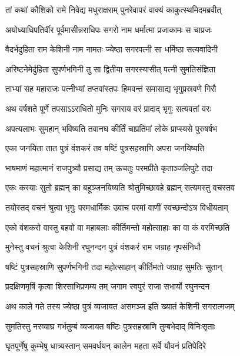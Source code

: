
\twolineshloka
{तां कथां कौशिको रामे निवेद्य मधुराक्षराम्}
{पुनरेवापरं वाक्यं काकुत्स्थमिदमब्रवीत्} %

\twolineshloka
{अयोध्याधिपतिर्वीर पूर्वमासीन्नराधिपः}
{सगरो नाम धर्मात्मा प्रजाकामः स चाप्रजः} %

\twolineshloka
{वैदर्भदुहिता राम केशिनी नाम नामतः}
{ज्येष्ठा सगरपत्नी सा धर्मिष्ठा सत्यवादिनी} %

\twolineshloka
{अरिष्टनेमेर्दुहिता सुपर्णभगिनी तु सा}
{द्वितीया सगरस्यासीत् पत्नी सुमतिसंज्ञिता} %

\twolineshloka
{ताभ्यां सह महाराजः पत्नीभ्यां तप्तवांस्तपः}
{हिमवन्तं समासाद्य भृगुप्रस्रवणे गिरौ} %

\twolineshloka
{अथ वर्षशते पूर्णे तपसाऽऽराधितो मुनिः}
{सगराय वरं प्रादाद् भृगुः सत्यवतां वरः} %

\twolineshloka
{अपत्यलाभः सुमहान् भविष्यति तवानघ}
{कीर्तिं चाप्रतिमां लोके प्राप्स्यसे पुरुषर्षभ} %

\twolineshloka
{एका जनयिता तात पुत्रं वंशकरं तव}
{षष्टिं पुत्रसहस्राणि अपरा जनयिष्यति} %

\twolineshloka
{भाषमाणं महात्मानं राजपुत्र्यौ प्रसाद्य तम्}
{ऊचतुः परमप्रीते कृताञ्जलिपुटे तदा} %

\twolineshloka
{एकः कस्याः सुतो ब्रह्मन् का बहूञ्जनयिष्यति}
{श्रोतुमिच्छावहे ब्रह्मन् सत्यमस्तु वचस्तव} %

\twolineshloka
{तयोस्तद् वचनं श्रुत्वा भृगुः परमधार्मिकः}
{उवाच परमां वाणीं स्वच्छन्दोऽत्र विधीयताम्} %

\twolineshloka
{एको वंशकरो वास्तु बहवो वा महाबलाः}
{कीर्तिमन्तो महोत्साहाः का वा कं वरमिच्छति} %

\twolineshloka
{मुनेस्तु वचनं श्रुत्वा केशिनी रघुनन्दन}
{पुत्रं वंशकरं राम जग्राह नृपसंनिधौ} %

\twolineshloka
{षष्टिं पुत्रसहस्राणि सुपर्णभगिनी तदा}
{महोत्साहान् कीर्तिमतो जग्राह सुमतिः सुतान्} %

\twolineshloka
{प्रदक्षिणमृषिं कृत्वा शिरसाभिप्रणम्य तम्}
{जगाम स्वपुरं राजा सभार्यो रघुनन्दन} %

\twolineshloka
{अथ काले गते तस्य ज्येष्ठा पुत्रं व्यजायत}
{असमञ्ज इति ख्यातं केशिनी सगरात्मजम्} %

\twolineshloka
{सुमतिस्तु नरव्याघ्र गर्भतुम्बं व्यजायत}
{षष्टिः पुत्रसहस्राणि तुम्बभेदाद् विनिःसृताः} %

\twolineshloka
{घृतपूर्णेषु कुम्भेषु धात्र्यस्तान् समवर्धयन्}
{कालेन महता सर्वे यौवनं प्रतिपेदिरे} %

